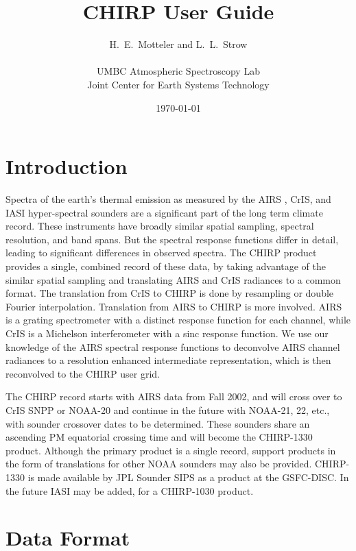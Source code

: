 \documentclass[12pt]{article}
\title{
  CHIRP User Guide \\
}
\author{H.~E.~Motteler and L.~L.~Strow \\
  \\
  UMBC Atmospheric Spectroscopy Lab \\
  Joint Center for Earth Systems Technology \\
}
\date{\today}
\begin{document}
\maketitle

\section{Introduction}
\label{intro}

Spectra of the earth's thermal emission as measured by the AIRS
\cite{airs1}, CrIS\cite{cris1,cris2}, and IASI \cite{iasi1}
hyper-spectral sounders are a significant part of the long term
climate record.  These instruments have broadly similar spatial
sampling, spectral resolution, and band spans.  But the spectral
response functions differ in detail, leading to significant
differences in observed spectra.  The CHIRP product provides a
single, combined record of these data, by taking advantage of the
similar spatial sampling and translating AIRS and CrIS radiances to
a common format.  The translation from CrIS to CHIRP is done by
resampling or double Fourier interpolation.  Translation from AIRS
to CHIRP is more involved.  AIRS is a grating spectrometer with a
distinct response function for each channel, while CrIS is a
Michelson interferometer with a sinc response function.  We use our
knowledge of the AIRS spectral response functions to deconvolve AIRS
channel radiances to a resolution enhanced intermediate
representation, which is then reconvolved to the CHIRP user grid.

The CHIRP record starts with AIRS data from Fall 2002, and will
cross over to CrIS SNPP or NOAA-20 and continue in the future with
NOAA-21, 22, etc., with sounder crossover dates to be determined.
These sounders share an ascending PM equatorial crossing time and
will become the CHIRP-1330 product.  Although the primary product is
a single record, support products in the form of translations for
other NOAA sounders may also be provided.  CHIRP-1330 is made
available by JPL Sounder SIPS as a product at the GSFC-DISC.  In the
future IASI may be added, for a CHIRP-1030 product.

\section{Data Format}
\label{format}
\end{document}
